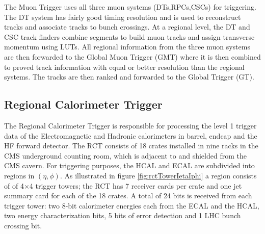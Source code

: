The Muon Trigger uses all three muon systems (DTs,RPCs,CSCs) for triggering.
The DT system has fairly good timing resolution and is used to reconstruct tracks
and associate tracks to bunch crossings. At a regional level, the DT and CSC track finders
combine segments to build muon tracks and assign transverse momentum using
LUTs. All regional information from the three muon systems are then forwarded
to the Global Muon Trigger (GMT) where it is then combined to proved track
information with equal or better resolution than the regional systems. The tracks
are then ranked and forwarded to the Global Trigger (GT).

  \subsection{Regional Calorimeter Trigger}
The Regional Calorimeter Trigger is responsible for processing the level 1 trigger data of the 
Electromagnetic and Hadronic calorimeters in barrel, endcap and the HF forward detector.
The RCT consists of 18 crates installed in nine racks in the CMS underground 
counting room, which is adjacent to and shielded from the CMS cavern.
For triggering purposes, the HCAL and ECAL are subdivided into regions in 
$(\eta,\phi)$. As illustrated in figure \ref{fig:rctTowerIetaIphi}
a region consists of of 4$\times$4 trigger towers; 
the RCT has 7 receiver cards per crate and one jet summary card for each of the 18 crates. 
A total of 24 bits is received from each trigger tower: 
two 8-bit calorimeter energies each from the ECAL and the HCAL,
two energy characterization bits, 5 bits of error detection and 1 LHC bunch crossing bit.
